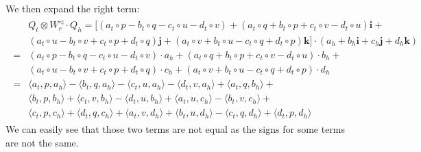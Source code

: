 \documentclass{article}
\begin{document}
We then expand the right term:
\begin{align*}
\begin{split}
&Q_t \otimes W_r^{\triangleleft} \cdot Q_h =
    [( a_t \circ p - b_t\circ q - c_t\circ u - d_t\circ v )  + (a_t\circ q + b_t\circ p + c_t\circ v - d_t\circ u) \textbf{i}
   +  \\&(a_t\circ u - b_t\circ v + c_t\circ p + d_t\circ q) \textbf{j} + (a_t\circ v + b_t\circ u - c_t\circ q + d_t\circ p) \textbf{k} ]
 \cdot (a_h + b_h \textbf{i} + c_h \textbf{j} + d_h \textbf{k})\\ =
   &( a_t\circ p - b_t\circ q - c_t\circ u - d_t\circ v )  \cdot a_h + (a_t\circ q + b_t\circ p + c_t\circ v - d_t\circ u)  \cdot b_h +  \\
   &(a_t\circ u - b_t\circ v + c_t\circ p + d_t\circ q)  \cdot c_h + (a_t\circ v + b_t\circ u - c_t\circ q + d_t\circ p)  \cdot d_h \\
   = & \langle a_t, p, a_h\rangle - \langle b_t, q, a_h\rangle - \langle c_t, u, a_h\rangle - \langle d_t, v, a_h\rangle + \langle a_t, q, b_h\rangle + \\ &\langle b_t, p, b_h\rangle + \langle c_t, v, b_h\rangle - \langle d_t, u, b_h\rangle + \langle a_t, u, c_h\rangle - \langle b_t, v, c_h\rangle + \\ &\langle c_t, p, c_h\rangle + \langle d_t, q, c_h\rangle + \langle a_t, v, d_h\rangle + \langle b_t, u, d_h\rangle - \langle c_t, q, d_h\rangle + \langle d_t,p, d_h\rangle
\end{split}
\end{align*}
We can easily see that those two terms are not equal as the signs for some terms are not the same.
\end{document}
